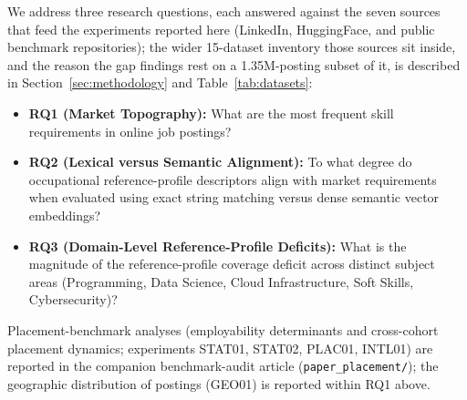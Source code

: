 \documentclass[journal]{IEEEtran}
\begin{document}
We address three research questions, each answered against the seven sources that feed the experiments reported here (LinkedIn, HuggingFace, and public benchmark repositories); the wider 15-dataset inventory those sources sit inside, and the reason the gap findings rest on a 1.35M-posting subset of it, is described in Section~\ref{sec:methodology} and Table~\ref{tab:datasets}:
\begin{itemize}
    \item \textbf{RQ1 (Market Topography):} What are the most frequent skill requirements in online job postings?
    \item \textbf{RQ2 (Lexical versus Semantic Alignment):} To what degree do occupational reference-profile descriptors align with market requirements when evaluated using exact string matching versus dense semantic vector embeddings?
    \item \textbf{RQ3 (Domain-Level Reference-Profile Deficits):} What is the magnitude of the reference-profile coverage deficit across distinct subject areas (Programming, Data Science, Cloud Infrastructure, Soft Skills, Cybersecurity)?
\end{itemize}

Placement-benchmark analyses (employability determinants and cross-cohort placement dynamics; experiments STAT01, STAT02, PLAC01, INTL01) are reported in the companion benchmark-audit article (\texttt{paper\_placement/}); the geographic distribution of postings (GEO01) is reported within RQ1 above.
\end{document}
